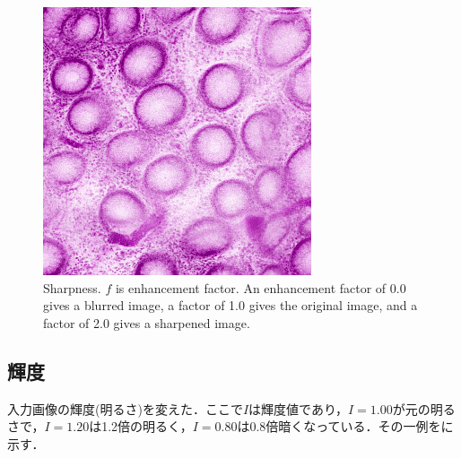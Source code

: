 \begin{figure}[H]
\begin{minipage}{0.24\columnwidth}
	\end{minipage}
	\begin{minipage}{0.24\columnwidth}
		\centering
		\includegraphics[clip, width=\linewidth]{fig/preprocessing/data_aug/color/SHARPNESS/SHARPNESS_2_00}
	\end{minipage}
	
	\caption{Sharpness. $f$ is enhancement factor. An enhancement factor of 0.0 gives a blurred image, a factor of 1.0 gives the original image, and a factor of 2.0 gives a sharpened image.}
	\label{fig:シャープネス}
	
\end{figure}

\subsection*{輝度}
入力画像の輝度(明るさ)を変えた．ここで$I$は輝度値であり，$I=1.00$が元の明るさで，$I=1.20$は1.2倍の明るく，$I=0.80$は0.8倍暗くなっている．その一例をに示す．

